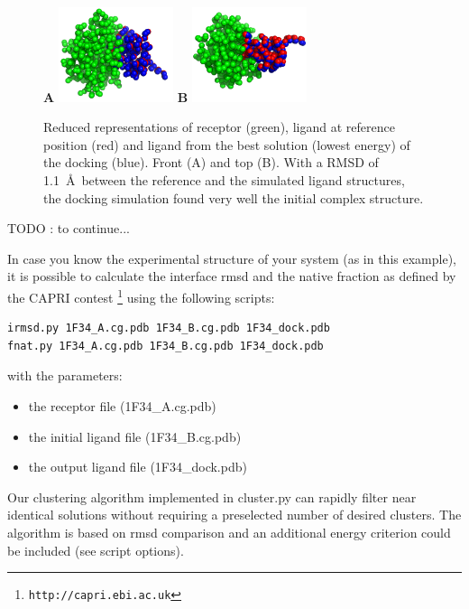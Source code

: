 \documentclass[12pt,a4paper]{article}
\begin{document}
\begin{figure}[htbp]
\center
{\textbf A}
\includegraphics*[width=0.30\textwidth]{img/1CGI_dock1_front.png}
\hspace*{2cm}
{\textbf B}
\includegraphics*[width=0.30\textwidth]{img/1CGI_dock1_top.png}
\caption{Reduced representations of receptor (green), ligand at reference position (red)
and ligand from the best solution (lowest energy) of the docking (blue). Front (A) and top (B).
With a RMSD of 1.1~\AA\ between the reference and the simulated ligand structures, the docking 
simulation found very well the initial complex structure.}
\end{figure}


TODO : to continue...


In case you know the experimental structure of your system (as in this example), it is possible to calculate the
interface rmsd and the native fraction as defined by the CAPRI contest \footnote{\tt http://capri.ebi.ac.uk}
using the following scripts:


\begin{verbatim}
irmsd.py 1F34_A.cg.pdb 1F34_B.cg.pdb 1F34_dock.pdb
fnat.py 1F34_A.cg.pdb 1F34_B.cg.pdb 1F34_dock.pdb
\end{verbatim}

with the parameters:
\begin{itemize}
\item the receptor file (1F34\_A.cg.pdb)
\item the initial ligand file (1F34\_B.cg.pdb)
\item the output ligand file (1F34\_dock.pdb)
\end{itemize}

Our clustering algorithm implemented in cluster.py can rapidly filter near identical solutions without requiring a preselected number of desired clusters.
The algorithm is based on rmsd comparison and an additional energy criterion could be included (see script options).
\end{document}
